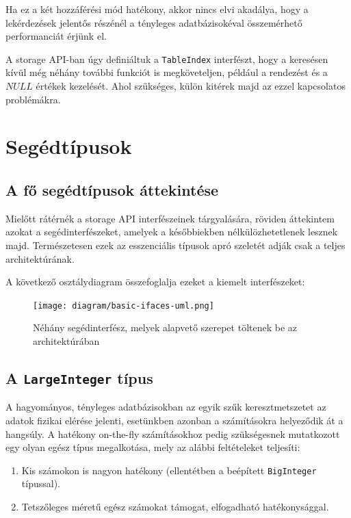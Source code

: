 \documentclass[
    parspace,
    noindent,
    nohyp,
]{elteiktdk}[2023/04/10]
\begin{document}
Ha ez a két hozzáférési mód hatékony, akkor nincs elvi akadálya,
hogy a lekérdezések jelentős részénél a tényleges adatbázisokéval
összemérhető performanciát érjünk el.

A storage API-ban úgy definiáltuk a \texttt{TableIndex} interfészt,
hogy a keresésen kívül még néhány további funkciót is megköveteljen,
például a rendezést és a $NULL$ értékek kezelését.
Ahol szükséges, külön kitérek majd az ezzel kapcsolatos problémákra.

\section{Segédtípusok}

\subsection{A fő segédtípusok áttekintése}

Mielőtt rátérnék a storage API interfészeinek tárgyalására,
röviden áttekintem azokat a segédinterfészeket,
amelyek a későbbiekben nélkülözhetetlenek lesznek majd.
Természetesen ezek az esszenciális típusok apró szeletét adják csak a teljes architektúrának.

A következő osztálydiagram összefoglalja ezeket a kiemelt interfészeket:

\begin{figure}[H]
\centering
\texttt{[image: diagram/basic-ifaces-uml.png]}
\caption[Alapvető segédinterfészek]{
    Néhány segédinterfész, melyek alapvető szerepet töltenek be az architektúrában
}
\end{figure}

\subsection{A \texttt{LargeInteger} típus}

A hagyományos, tényleges adatbázisokban az egyik szűk keresztmetszetet
az adatok fizikai elérése jelenti,
esetünkben azonban a számításokra helyeződik át a hangsúly.
A hatékony on-the-fly számításokhoz pedig
szükségesnek mutatkozott egy olyan egész típus megalkotása,
mely az alábbi feltételeket teljesíti:

\begin{enumerate}
    \item Kis számokon is nagyon hatékony (ellentétben a beépített \texttt{BigInteger} típussal).
    \item Tetszőleges méretű egész számokat támogat, elfogadható hatékonysággal.
\end{enumerate}
\end{document}
